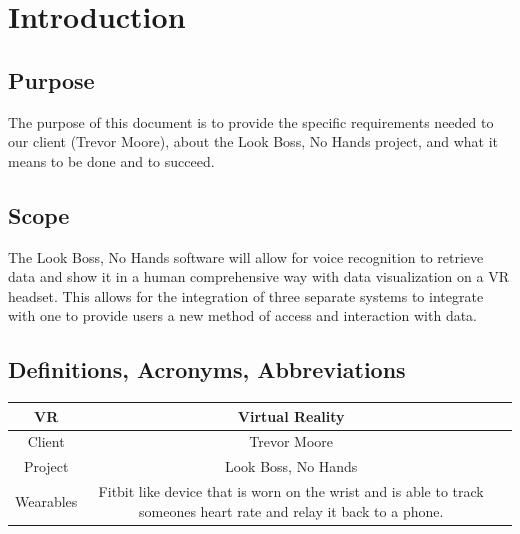 \documentclass[onecolumn, draftclsnofoot,10pt, compsoc]{IEEEtran}
\begin{document}
\begin{titlepage}
\begin{singlespace}
\begin{abstract}
        \end{abstract}
    \end{singlespace}
\end{titlepage}
\newpage
{}
\tableofcontents
\clearpage


\section{Introduction}
    \subsection{Purpose}
        The purpose of this document is to provide the specific requirements needed to our client (Trevor Moore), about the Look Boss, No Hands project, and what it means to be done and to succeed.

    \subsection{Scope}
        The Look Boss, No Hands software will allow for voice recognition to retrieve data and show it in a human comprehensive way with data visualization on a VR headset. This allows for the integration of three separate systems to integrate with one to provide users a new method of access and interaction with data.

    \subsection{Definitions, Acronyms, Abbreviations}

    \begin{center}
        \begin{tabular}{|c| c| c|}
            \hline
            VR & Virtual Reality \\
            \hline
            Client & Trevor Moore \\
            \hline
            Project & Look Boss, No Hands \\
            \hline
            Wearables & Fitbit like device that is worn on the wrist and is able to track someones heart rate and relay it back to a phone.\\
            \hline
        \end{tabular}
    \end{center}
\end{document}
